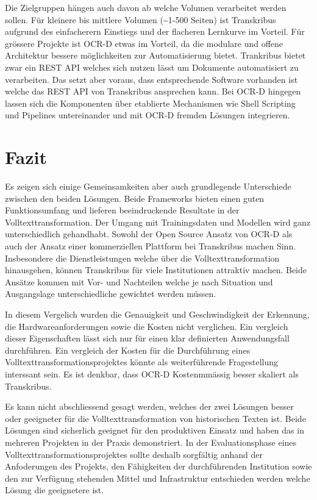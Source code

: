 \documentclass[a4paper,oneside, 12pt]{report}
\begin{document}
Die Zielgruppen hängen auch davon ab welche Volumen verarbeitet werden sollen. Für kleinere bis mittlere Volumen (\textasciitilde1-500 Seiten) ist Transkribus aufgrund des einfacherern Einstiegs und der flacheren Lernkurve im Vorteil. Für grössere Projekte ist OCR-D etwas im Vorteil, da die modulare und offene Architektur bessere möglichkeiten zur Automatisierung bietet. Trankribus bietet zwar ein REST API welches sich nutzen lässt um Dokumente automatisiert zu verarbeiten. Das setzt aber voraus, dass entsprechende Software vorhanden ist welche das REST API von Transkribus ansprechen kann. Bei OCR-D hingegen lassen sich die Komponenten über etablierte Mechanismen wie Shell Scripting und Pipelines untereinander und mit OCR-D fremden Lösungen integrieren.

\section{Fazit}
Es zeigen sich einige Gemeinsamkeiten aber auch grundlegende Unterschiede zwischen den beiden Lösungen. Beide Frameworks bieten einen guten Funktionsumfang und lieferen beeindruckende Resultate in der Volltexttransformation. Der Umgang mit Trainingsdaten und Modellen wird ganz unterschiedlich gehandhabt. Sowohl der Open Source Ansatz von OCR-D als auch der Ansatz einer kommerziellen Plattform bei Transkribus machen Sinn. Insbesondere die Dienstleistungen welche über die Volltexttransformation hinausgehen, können Transkribus für viele Institutionen attraktiv machen. Beide Ansätze kommen mit Vor- und Nachteilen welche je nach Situation und Ausgangslage unterschiedliche gewichtet werden müssen. 

In diesem Vergelich wurden die Genauigkeit und Geschwindigkeit der Erkennung, die Hardwareanforderungen sowie die Kosten nicht verglichen. Ein vergleich dieser Eigenschaften lässt sich nur für einen klar definierten Anwendungsfall durchführen. Ein vergleich der Kosten für die Durchführung eines Volltexttransformationsprojektes könnte als weiterführende Fragestellung interssant sein. Es ist denkbar, dass OCR-D Kostenmmässig besser skaliert als Transkribus.

Es kann nicht abschliessend gesagt werden, welches der zwei Lösungen besser oder geeigneter für die Volltexttransformation von historischen Texten ist. Beide Lösungen sind sicherlich geeignet für den produktiven Einsatz und haben das in mehreren Projekten in der Praxis demonstriert. In der Evaluationsphase eines Volltexttransformationsprojektes sollte deshalb sorgfältig anhand der Anfoderungen des Projekts, den Fähigkeiten der durchführenden Institution sowie den zur Verfügung stehenden Mittel und Infrastruktur entschieden werden welche Lösung die geeignetere ist.
\end{document}
